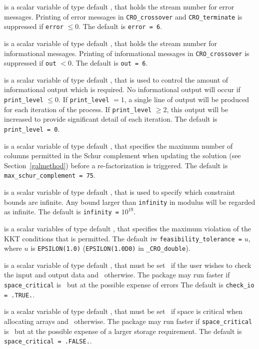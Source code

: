 \documentclass{galahad}
\newcommand{\packagename}{CRO}
\newcommand{\fullpackagename}{\libraryname\_\packagename}
\begin{document}
\begin{description}

 is a scalar variable of type default \integer, that holds the
stream number for error messages. Printing of error messages in
{\tt \packagename\_crossover} and {\tt \packagename\_terminate}
is suppressed if
{\tt error} $\leq 0$.
The default is {\tt error = 6}.

 is a scalar variable of type default \integer, that holds the
stream number for informational messages. Printing of informational messages in
{\tt \packagename\_crossover} is suppressed if {\tt out} $< 0$.
The default is {\tt out = 6}.

 is a scalar variable of type default \integer, that is used
to control the amount of informational output which is required. No
informational output will occur if {\tt print\_level} $\leq 0$. If
{\tt print\_level} $= 1$, a single line of output will be produced for each
iteration of the process. If {\tt print\_level} $\geq 2$, this output will be
increased to provide significant detail of each iteration.
The default is {\tt print\_level = 0}.

 is a scalar variable of type default \integer,
that specifies
the maximum number of columns permitted in the Schur complement when
updating the solution (see Section~\ref{galmethod})
before a re-factorization is triggered.
The default is {\tt max\_schur\_complement = 75}.

 is a scalar variable of type default \realdp, that is used to
specify which constraint bounds are infinite.
Any bound larger than {\tt infinity} in modulus will be regarded as infinite.
The default is {\tt infinity =} $10^{19}$.

is a scalar variables of type default \realdp, that specifies the
maximum violation of the KKT conditions that is permitted.
The default iw {\tt feasibility\_toler\-ance =} $u$,
where $u$ is {\tt EPSILON(1.0)} ({\tt EPSILON(1.0D0)} in
{\tt \fullpackagename\_double}).

 is a scalar variable of type default \logical,
that must be set \true\ if the user wishes to check the input and output
data and  \false\ otherwise. The package may run faster if
{\tt space\_critical} is \false\ but at the possible expense of errors
The default is {\tt check\_io = .TRUE.}.

 is a scalar variable of type default \logical,
that must be set \true\ if space is critical when allocating arrays
and  \false\ otherwise. The package may run faster if
{\tt space\_critical} is \false\ but at the possible expense of a larger
storage requirement. The default is {\tt space\_critical = .FALSE.}.


\end{description}
\end{document}
